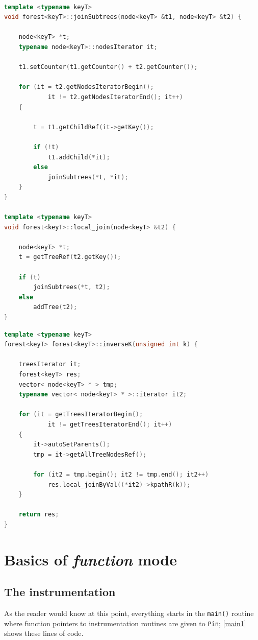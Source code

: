 \documentclass[a4paper,10pt]{report}
\begin{document}
\begin{lstlisting}[language=C++, 
	caption={the implementation of the $join$ operation}, 
	label=joinop, frame=leftline]

template <typename keyT>
void forest<keyT>::joinSubtrees(node<keyT> &t1, node<keyT> &t2) {

	node<keyT> *t;
	typename node<keyT>::nodesIterator it;

	t1.setCounter(t1.getCounter() + t2.getCounter());

	for (it = t2.getNodesIteratorBegin(); 
			it != t2.getNodesIteratorEnd(); it++) 
	{
	
		t = t1.getChildRef(it->getKey());

		if (!t)
			t1.addChild(*it);
		else
			joinSubtrees(*t, *it); 
	}
}

template <typename keyT>
void forest<keyT>::local_join(node<keyT> &t2) {

	node<keyT> *t;
	t = getTreeRef(t2.getKey());

	if (t)
		joinSubtrees(*t, t2);
	else
		addTree(t2);
}

\end{lstlisting}

\begin{lstlisting}[language=C++, 
	caption={the implementation of the $inv_k$ operation}, 
	label=invk, frame=leftline]
template <typename keyT>
forest<keyT> forest<keyT>::inverseK(unsigned int k) {

	treesIterator it;
	forest<keyT> res;
	vector< node<keyT> * > tmp;
	typename vector< node<keyT> * >::iterator it2;
	
	for (it = getTreesIteratorBegin(); 
			it != getTreesIteratorEnd(); it++) 
	{
		it->autoSetParents();
		tmp = it->getAllTreeNodesRef();

		for (it2 = tmp.begin(); it2 != tmp.end(); it2++)
			res.local_joinByVal((*it2)->kpathR(k));
	}

	return res;
}
\end{lstlisting}

\section{Basics of \emph{function} mode}

\subsection{The instrumentation}

As the reader would know at this point, everything starts in the \verb|main()| routine
where function pointers to instrumentation routines are given to \texttt{Pin};
\cref{main1} shows these lines of code.
\end{document}
